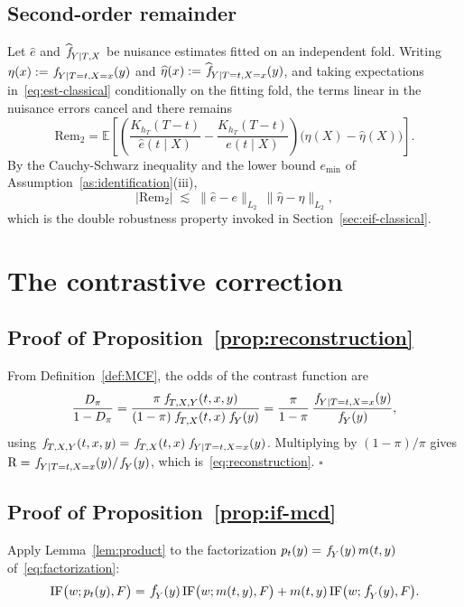 \documentclass[11pt]{article}
\theoremstyle{plain}
\theoremstyle{definition}
\theoremstyle{remark}
\newcommand{\pE}{\ensuremath{\mathbb{E}}}
\newcommand{\pf}[1]{\ensuremath{\,\mathlarger{\textit{f}}_{#1}}}
\newcommand{\pfhat}[1]{\ensuremath{\,\mathlarger{\widehat{\textit{f}}}_{#1}}}
\newcommand{\ratio}{\ensuremath{\pi}}
\newcommand{\contrast}{D_{\ratio}}
\newcommand{\DensityRatio}{\text{R}}
\newcommand{\IF}{\mathrm{IF}}
\newcommand{\gps}{e}
\newcommand{\Rem}{\mathrm{Rem}}
\begin{document}
\subsection{Second-order remainder}
\label{app:classical-remainder}

Let $\widehat\gps$ and $\pfhat{Y \mid T,X}$ be nuisance estimates fitted on an
independent fold. Writing $\eta(x) := \pf{Y \mid T=t,X=x}(y)$ and
$\widehat\eta(x) := \pfhat{Y \mid T=t,X=x}(y)$, and taking expectations
in~\eqref{eq:est-classical} conditionally on the fitting fold, the terms linear in the
nuisance errors cancel and there remains
\begin{equation}
\Rem_2
= \pE\!\left[
\left( \frac{K_{h_T}(T-t)}{\widehat\gps(t \mid X)}
- \frac{K_{h_T}(T-t)}{\gps(t \mid X)} \right)
\Big( \eta(X) - \widehat\eta(X) \Big)
\right].
\label{eq:app-remainder}
\end{equation}
By the Cauchy-Schwarz inequality and the lower bound $\gps_{\min}$ of
Assumption~\ref{as:identification}(iii),
\[
|\Rem_2| \;\lesssim\; \big\| \widehat\gps - \gps \big\|_{L_2}\,
\big\| \widehat\eta - \eta \big\|_{L_2} ,
\]
which is the double robustness property invoked in Section~\ref{sec:eif-classical}.

\section{The contrastive correction}
\label{app:mcd}

\subsection{Proof of Proposition~\ref{prop:reconstruction}}
\label{app:mcd-reconstruction}

From Definition~\ref{def:MCF}, the odds of the contrast function are
\[
\frac{\contrast}{1-\contrast}
= \frac{\ratio\,\pf{T,X,Y}(t,x,y)}{(1-\ratio)\,\pf{T,X}(t,x)\,\pf{Y}(y)}
= \frac{\ratio}{1-\ratio}\,
\frac{\pf{Y \mid T=t,X=x}(y)}{\pf{Y}(y)} ,
\]
using $\pf{T,X,Y}(t,x,y) = \pf{T,X}(t,x)\,\pf{Y \mid T=t,X=x}(y)$. Multiplying by
$(1-\ratio)/\ratio$ gives
$\DensityRatio = \pf{Y \mid T=t,X=x}(y)/\pf{Y}(y)$, which is~\eqref{eq:reconstruction}.
\hfill$\square$

\subsection{Proof of Proposition~\ref{prop:if-mcd}}
\label{app:mcd-derivation}

Apply Lemma~\ref{lem:product} to the factorization $p_t(y) = \pf{Y}(y)\,m(t,y)$
of~\eqref{eq:factorization}:
\begin{equation}
\IF\big(w;p_t(y),F\big)
= \pf{Y}(y)\,\IF\big(w;m(t,y),F\big)
+ m(t,y)\,\IF\big(w;\pf{Y}(y),F\big).
\label{eq:app-product}
\end{equation}
\end{document}
